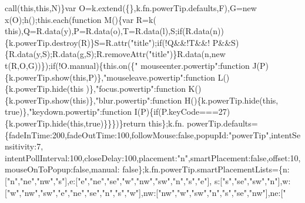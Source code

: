 \begin{DoxyCode}
{      call(\textcolor{keyword}{this},\textcolor{keyword}{this},N)\}var O=k.extend(\{\},k.fn.powerTip.defaults,F),G=\textcolor{keyword}{new} x(O);h();this.each(\textcolor{keyword}{function} M()\{var R=k(\textcolor{keyword}{
      this}),Q=R.data(y),P=R.data(o),T=R.data(l),S;\textcolor{keywordflow}{if}(R.data(n))\{k.powerTip.destroy(R)\}S=R.attr(\textcolor{stringliteral}{"title"});\textcolor{keywordflow}{if}(!Q&&!T&&!
      P&&S)\{R.data(y,S);R.data(g,S);R.removeAttr(\textcolor{stringliteral}{"title"})\}R.data(n,\textcolor{keyword}{new} t(R,O,G))\});\textcolor{keywordflow}{if}(!O.manual)\{this.on(\{\textcolor{stringliteral}{"
      mouseenter.powertip"}:\textcolor{keyword}{function} J(P)\{k.powerTip.show(\textcolor{keyword}{this},P)\},\textcolor{stringliteral}{"mouseleave.powertip"}:\textcolor{keyword}{function} L()\{k.powerTip.hide(\textcolor{keyword}{this}
      )\},\textcolor{stringliteral}{"focus.powertip"}:\textcolor{keyword}{function} K()\{k.powerTip.show(\textcolor{keyword}{this})\},\textcolor{stringliteral}{"blur.powertip"}:\textcolor{keyword}{function} H()\{k.powerTip.hide(\textcolor{keyword}{this},\textcolor{keyword}{
      true})\},\textcolor{stringliteral}{"keydown.powertip"}:\textcolor{keyword}{function} I(P)\{\textcolor{keywordflow}{if}(P.keyCode===27)\{k.powerTip.hide(\textcolor{keyword}{this},\textcolor{keyword}{true})\}\}\})\}\textcolor{keywordflow}{return} \textcolor{keyword}{this}\};k.fn.
      powerTip.defaults=\{fadeInTime:200,fadeOutTime:100,followMouse:\textcolor{keyword}{false},popupId:\textcolor{stringliteral}{"powerTip"},intentSensitivity:7,
      intentPollInterval:100,closeDelay:100,placement:\textcolor{stringliteral}{"n"},smartPlacement:\textcolor{keyword}{false},offset:10,mouseOnToPopup:\textcolor{keyword}{false},manual:\textcolor{keyword}{
      false}\};k.fn.powerTip.smartPlacementLists=\{n:[\textcolor{stringliteral}{"n"},\textcolor{stringliteral}{"ne"},\textcolor{stringliteral}{"nw"},\textcolor{stringliteral}{"s"}],e:[\textcolor{stringliteral}{"e"},\textcolor{stringliteral}{"ne"},\textcolor{stringliteral}{"se"},\textcolor{stringliteral}{"w"},\textcolor{stringliteral}{"nw"},\textcolor{stringliteral}{"sw"},\textcolor{stringliteral}{"n"},\textcolor{stringliteral}{"s"},\textcolor{stringliteral}{"e"}],
      s:[\textcolor{stringliteral}{"s"},\textcolor{stringliteral}{"se"},\textcolor{stringliteral}{"sw"},\textcolor{stringliteral}{"n"}],w:[\textcolor{stringliteral}{"w"},\textcolor{stringliteral}{"nw"},\textcolor{stringliteral}{"sw"},\textcolor{stringliteral}{"e"},\textcolor{stringliteral}{"ne"},\textcolor{stringliteral}{"se"},\textcolor{stringliteral}{"n"},\textcolor{stringliteral}{"s"},\textcolor{stringliteral}{"w"}],nw:[\textcolor{stringliteral}{"nw"},\textcolor{stringliteral}{"w"},\textcolor{stringliteral}{"sw"},\textcolor{stringliteral}{"n"},\textcolor{stringliteral}{"s"},\textcolor{stringliteral}{"se"},\textcolor{stringliteral}{"nw"}],ne:[\textcolor{stringliteral}{"
}}
\end{DoxyCode}
